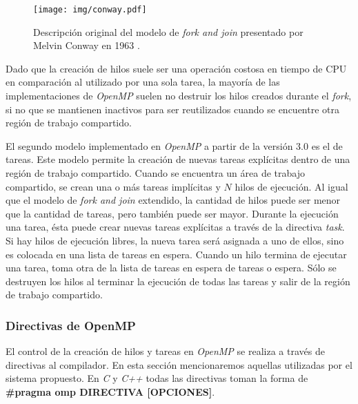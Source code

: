 \begin{figure}[!htb]

	\centering

	\texttt{[image: img/conway.pdf]}

	\caption{Descripción original del modelo de \emph{fork and join}
	presentado por Melvin Conway en 1963 \cite{conway1963}.}

	\label{conway}

\end{figure}

Dado que la creación de hilos suele ser una operación costosa en tiempo de CPU
en comparación al utilizado por una sola tarea, la mayoría de las
implementaciones de \emph{OpenMP} suelen no destruir los hilos creados durante
el \emph{fork}, si no que se mantienen inactivos para ser reutilizados cuando se
encuentre otra región de trabajo compartido.

El segundo modelo implementado en \emph{OpenMP} a partir de la versión 3.0 es el
de tareas. Este modelo permite la creación de nuevas tareas explícitas dentro de
una región de trabajo compartido. Cuando se encuentra un área de trabajo
compartido, se crean una o más tareas implícitas y $N$ hilos de ejecución. Al
igual que el modelo de \emph{fork and join} extendido, la cantidad de hilos
puede ser menor que la cantidad de tareas, pero también puede ser mayor. Durante
la ejecución una tarea, ésta puede crear nuevas tareas explícitas a través de la
directiva \emph{task}. Si hay hilos de ejecución libres, la nueva tarea será
asignada a uno de ellos, sino es colocada en una lista de tareas en espera.
Cuando un hilo termina de ejecutar una tarea, toma otra de la lista de tareas en
espera de tareas o espera. Sólo se destruyen los hilos al terminar la ejecución
de todas las tareas y salir de la región de trabajo compartido.

\subsubsection{Directivas de OpenMP}

El control de la creación de hilos y tareas en \emph{OpenMP} se realiza a través
de directivas al compilador. En esta sección mencionaremos aquellas utilizadas
por el sistema propuesto. En \emph{C} y \emph{C++} todas las directivas toman la
forma de \textbf{\#pragma omp DIRECTIVA [OPCIONES]}.

